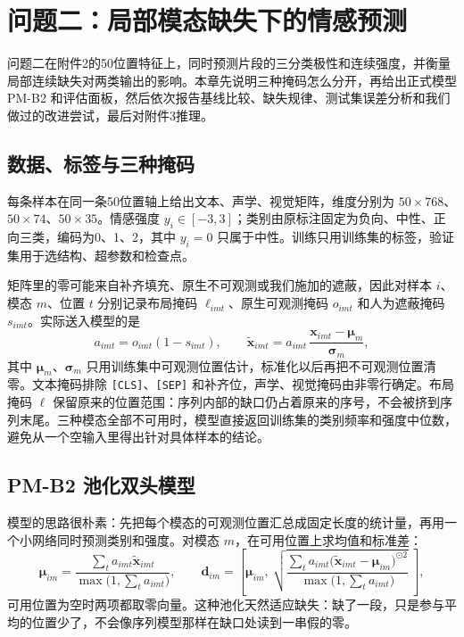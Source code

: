 \section{问题二：局部模态缺失下的情感预测}\label{sec:q2}

问题二在附件2的50位置特征上，同时预测片段的三分类极性和连续强度，并衡量局部连续缺失对两类输出的影响。本章先说明三种掩码怎么分开，再给出正式模型 PM-B2 和评估面板，然后依次报告基线比较、缺失规律、测试集误差分析和我们做过的改进尝试，最后对附件3推理。

\subsection{数据、标签与三种掩码}\label{sec:q2data}

每条样本在同一条50位置轴上给出文本、声学、视觉矩阵，维度分别为 $50\times768$、$50\times74$、$50\times35$。情感强度 $y_i\in[-3,3]$；类别由原标注固定为负向、中性、正向三类，编码为0、1、2，其中 $y_i=0$ 只属于中性。训练只用训练集的标签，验证集用于选结构、超参数和检查点。

矩阵里的零可能来自补齐填充、原生不可观测或我们施加的遮蔽，因此对样本 $i$、模态 $m$、位置 $t$ 分别记录布局掩码 $\ell_{imt}$、原生可观测掩码 $o_{imt}$ 和人为遮蔽掩码 $s_{imt}$。实际送入模型的是
\begin{equation}\label{eq:mask}
a_{imt}=o_{imt}(1-s_{imt}),\qquad \tilde{\boldsymbol x}_{imt}=a_{imt}\,\frac{\boldsymbol x_{imt}-\boldsymbol\mu_m}{\boldsymbol\sigma_m},
\end{equation}
其中 $\boldsymbol\mu_m$、$\boldsymbol\sigma_m$ 只用训练集中可观测位置估计，标准化以后再把不可观测位置清零。文本掩码排除 \texttt{[CLS]}、\texttt{[SEP]} 和补齐位，声学、视觉掩码由非零行确定。布局掩码 $\ell$ 保留原来的位置范围：序列内部的缺口仍占着原来的序号，不会被挤到序列末尾。三种模态全部不可用时，模型直接返回训练集的类别频率和强度中位数，避免从一个空输入里得出针对具体样本的结论。

\subsection{PM-B2 池化双头模型}\label{sec:pmb2}

模型的思路很朴素：先把每个模态的可观测位置汇总成固定长度的统计量，再用一个小网络同时预测类别和强度。对模态 $m$，在可用位置上求均值和标准差：
\begin{equation}\label{eq:pool2}
\boldsymbol\mu_{im}=\frac{\sum_t a_{imt}\tilde{\boldsymbol x}_{imt}}{\max\!\big(1,\sum_t a_{imt}\big)},\qquad
\boldsymbol d_{im}=\left[\boldsymbol\mu_{im},\ \sqrt{\frac{\sum_t a_{imt}\big(\tilde{\boldsymbol x}_{imt}-\boldsymbol\mu_{im}\big)^{\odot2}}{\max\!\big(1,\sum_t a_{imt}\big)}}\ \right],
\end{equation}
可用位置为空时两项都取零向量。这种池化天然适应缺失：缺了一段，只是参与平均的位置少了，不会像序列模型那样在缺口处读到一串假的零。

